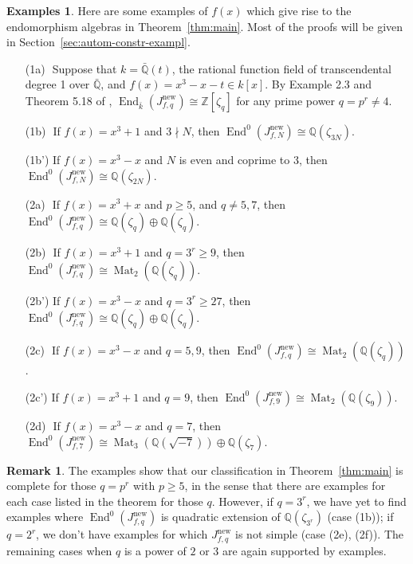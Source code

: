 \documentclass{amsart}[11pt]
\theoremstyle{definition}
\newtheorem{exs}[thm]{Examples}
\newtheorem{rem}[thm]{Remark}
\numberwithin{equation}{section}
\theoremstyle{notitle}
\begin{document}
\begin{exs}
  Here are some examples of $f(x)$ which give rise to the endomorphism
  algebras in Theorem~\ref{thm:main}. Most of the proofs will be given
  in Section~\ref{sec:autom-constr-exampl}.
  \begin{enumerate}
  \item[(1a)$\phantom{'}$] Suppose that $k=\bar{\mathbb{Q}}(t)$, the rational
    function field of transcendental degree 1 over $\bar{\mathbb{Q}}$, and
    $f(x)=x^3-x-t\in k[x]$. By Example 2.3 and Theorem 5.18 of
    \cite{MR2349666}, $\operatorname{End}_{\bar{k}}(J_{f,q}^{\mathrm{new}})\cong {\mathbb{Z}}[\zeta_q]$
    for any prime power $q=p^r\neq 4$.
\item[(1b)$\phantom{'}$] If $f(x)=x^3+1$ and $3\nmid N$, then
  $\operatorname{End}^0(J_{f,N}^{\mathrm{new}})\cong 
  {\mathbb{Q}}(\zeta_{3N})$. 
\item[(1b')] If $f(x)=x^3-x$ and $N$ is even and coprime to 3, then
  $\operatorname{End}^0(J_{f,N}^{\mathrm{new}})\cong {\mathbb{Q}}(\zeta_{2N})$.
\item[(2a)$\phantom{'}$] If $f(x)=x^3+x$ and $p\geq 5$, and $q\neq 5, 7$, then
  $\operatorname{End}^0(J_{f,q}^{\mathrm{new}})\cong {\mathbb{Q}}(\zeta_q)\oplus {\mathbb{Q}}(\zeta_q)$.
\item[(2b)$\phantom{'}$] If $f(x)=x^3+1$ and $q=3^r\geq 9$, then
  $\operatorname{End}^0(J_{f,q}^{\mathrm{new}})\cong 
  \operatorname{Mat}_2({\mathbb{Q}}(\zeta_q))$. 
\item[(2b')] If $f(x)=x^3-x$ and $q=3^r\geq 27$, then
  $\operatorname{End}^0(J_{f,q}^{\mathrm{new}})\cong 
  {\mathbb{Q}}(\zeta_q)\oplus {\mathbb{Q}}(\zeta_q)$. 
\item[(2c)$\phantom{'}$] If $f(x)=x^3-x$ and $q=5, 9$, then $\operatorname{End}^0(J_{f,q}^{\mathrm{new}})\cong 
  \operatorname{Mat}_2({\mathbb{Q}}(\zeta_q))$. 
\item[(2c')] If $f(x)=x^3+1$ and $q=9$, then $\operatorname{End}^0(J_{f,9}^{\mathrm{new}})\cong 
  \operatorname{Mat}_2({\mathbb{Q}}(\zeta_9))$. 
\item[(2d)$\phantom{'}$] If $f(x)=x^3-x$ and $q=7$, then $\operatorname{End}^0(J_{f,7}^{\mathrm{new}})\cong \operatorname{Mat}_3({\mathbb{Q}}(\sqrt{-7}))\oplus
       {\mathbb{Q}}(\zeta_7)$.
  \end{enumerate}
\end{exs}

\begin{rem}
  The examples show that our classification in Theorem~\ref{thm:main}
  is complete for those $q=p^r$ with $p\geq 5$, in the sense that
  there are examples for each case listed in the theorem for those
  $q$. However, if $q=3^r$, we have yet to find examples where
  $\operatorname{End}^0(J_{f,q}^{\mathrm{new}})$ is quadratic extension of ${\mathbb{Q}}(\zeta_{3^r})$
  (case (1b)); if $q=2^r$, we don't have examples for which
  $J_{f,q}^{\mathrm{new}}$ is not simple (case (2e), (2f)).  The remaining cases
  when $q$ is a power of $2$ or $3$ are again supported by examples.
\end{rem}
\end{document}
